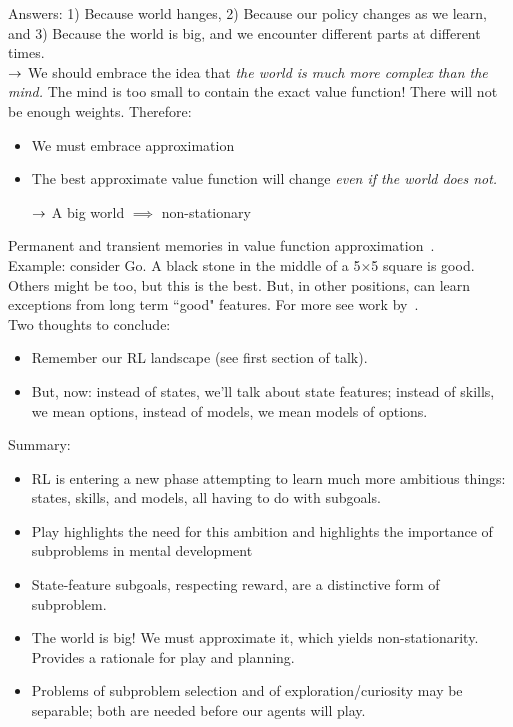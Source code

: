 Answers: 1) Because world hanges, 2) Because our policy changes as we learn, and 3) Because the world is big, and we encounter different parts at different times. \\

$\rightarrow$ We should embrace the idea that {\it the world is much more complex than the mind.} The mind is too small to contain the exact value function! There will not be enough weights. Therefore:
\begin{itemize}
    \item We must embrace approximation
    \item The best approximate value function will change {\it even if the world does not.}
    
    $\rightarrow$ A big world $\implies$ non-stationary
\end{itemize}

Permanent and transient memories in value function approximation~\cite{sutton2007role}. \\

Example: consider Go. A black stone in the middle of a 5$\times$5 square is good. Others might be too, but this is the best. But, in other positions, can learn exceptions from long term ``good" features. For more see work by~\citet{sutton2007role}. \\

Two thoughts to conclude:
\begin{itemize}
    \item Remember our RL landscape (see first section of talk).
    \item But, now: instead of states, we'll talk about state features; instead of skills, we mean options, instead of models, we mean models of options.
\end{itemize}

Summary:
\begin{itemize}
    \item RL is entering a new phase attempting to learn much more ambitious things: states, skills, and models, all having to do with subgoals.
    
    \item Play highlights the need for this ambition and highlights the importance of subproblems in mental development
    
    \item State-feature subgoals, respecting reward, are a distinctive form of subproblem.
    
    \item The world is big! We must approximate it, which yields non-stationarity. Provides a rationale for play and planning.
    
    \item Problems of subproblem selection and of exploration/curiosity may be separable; both are needed before our agents will play.
\end{itemize}


